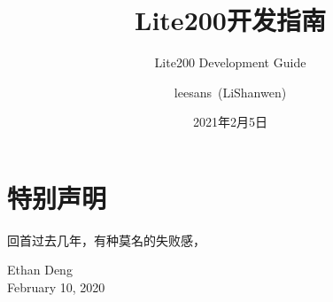 \documentclass[cn,11pt,chinese]{elegantbook}
\title{Lite200开发指南}
\subtitle{Lite200 Development Guide }
\author{leesans\ (LiShanwen)}
\date{2021年2月5日}
\begin{document}
\maketitle
\frontmatter

\chapter*{特别声明}

回首过去几年，有种莫名的失败感，

\vskip 1.5cm

\begin{flushright}
Ethan Deng\\
February 10, 2020
\end{flushright}

\tableofcontents
\mainmatter









\end{document}
